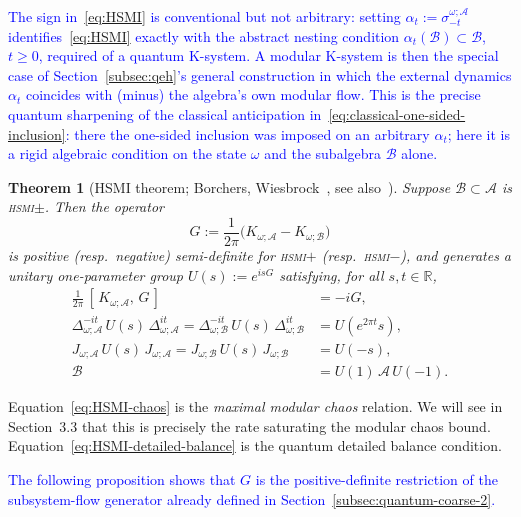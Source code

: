 \documentclass[a4paper,11pt]{article}
\newtheorem{theorem}{Theorem}
\theoremstyle{definition}
\theoremstyle{remark}
\newcommand{\mA}{\mathcal{A}}
\newcommand{\mB}{\mathcal{B}}
\begin{document}
\textcolor{blue}{The sign in~\eqref{eq:HSMI} is conventional but not arbitrary: setting
$\alpha_t:=\sigma_{-t}^{\omega;\mA}$ identifies~\eqref{eq:HSMI} exactly with the
abstract nesting condition $\alpha_t(\mB)\subset\mB$, $t\ge0$, required of a quantum
K-system.  A modular K-system is then the special case of
Section~\ref{subsec:qeh}'s general construction in which the external dynamics
$\alpha_t$ coincides with (minus) the algebra's own modular flow.  This is the precise
quantum sharpening of the classical anticipation in~\eqref{eq:classical-one-sided-inclusion}:
there the one-sided inclusion was imposed on an arbitrary $\alpha_t$; here it is a
rigid algebraic condition on the state $\omega$ and the subalgebra $\mB$ alone.}
 
\begin{theorem}[HSMI theorem; Borchers, Wiesbrock~{\cite{Borchers2000,Wiesbrock1993}},
see also~{\cite[Thm.~16]{OFLLM2024}}]
\label{thm:HSMI}
Suppose $\mB\subset\mA$ is \textsc{hsmi}$\pm$.  Then the operator
\begin{equation}
  G := \frac{1}{2\pi}\bigl(K_{\omega;\mA} - K_{\omega;\mB}\bigr)
  \label{eq:HSMI-generator}
\end{equation}
is positive (resp.\ negative) semi-definite for \textsc{hsmi}$+$ (resp.\ \textsc{hsmi}$-$),
and generates a unitary one-parameter group $U(s):=e^{isG}$ satisfying, for all
$s,t\in\mathbb{R}$,
\begin{align}
  \frac{1}{2\pi}\,[\,K_{\omega;\mA},\,G\,] &= -iG, \label{eq:HSMI-commutator}\\
  \Delta_{\omega;\mA}^{-it}\,U(s)\,\Delta_{\omega;\mA}^{it}
  = \Delta_{\omega;\mB}^{-it}\,U(s)\,\Delta_{\omega;\mB}^{it} &= U(e^{2\pi t}s),
  \label{eq:HSMI-chaos}\\
  J_{\omega;\mA}\,U(s)\,J_{\omega;\mA}
  = J_{\omega;\mB}\,U(s)\,J_{\omega;\mB} &= U(-s),
  \label{eq:HSMI-detailed-balance}\\
  \mB &= U(1)\,\mA\,U(-1). \label{eq:HSMI-translation}
\end{align}
\end{theorem}
 
Equation~\eqref{eq:HSMI-chaos} is the \emph{maximal modular chaos} relation.  We will
see in Section~3.3 that this is precisely the rate saturating the modular chaos bound.
Equation~\eqref{eq:HSMI-detailed-balance} is the quantum detailed balance condition.
 
\textcolor{blue}{The following proposition shows that $G$ is the positive-definite restriction of the
subsystem-flow generator already defined in Section~\ref{subsec:quantum-coarse-2}.}
 
\end{document}
